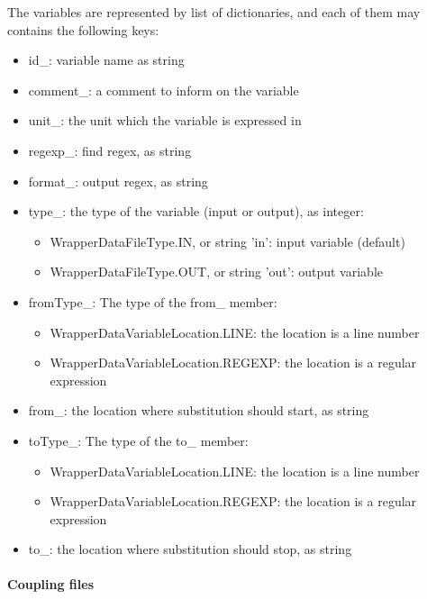 The variables are represented by list of dictionaries, and each of them may contains the following keys:
\begin{itemize}
\item id\_: variable name as string
\item comment\_: a comment to inform on the variable
\item unit\_: the unit which the variable is expressed in
\item regexp\_: find regex, as string
\item format\_: output regex, as string
\item type\_: the type of the variable (input or output), as integer:
  \begin{itemize}
  \item WrapperDataFileType.IN, or string 'in': input variable (default)
  \item WrapperDataFileType.OUT, or string 'out': output variable
  \end{itemize}
\item fromType\_: The type of the from\_ member:
  \begin{itemize}
  \item WrapperDataVariableLocation.LINE: the location is a line number
  \item WrapperDataVariableLocation.REGEXP: the location is a regular expression
  \end{itemize}
\item from\_: the location where substitution should start, as string
\item toType\_: The type of the to\_ member:
  \begin{itemize}
  \item WrapperDataVariableLocation.LINE: the location is a line number
  \item WrapperDataVariableLocation.REGEXP: the location is a regular expression
  \end{itemize}
\item to\_: the location where substitution should stop, as string
\end{itemize}

\paragraph{Coupling files}

